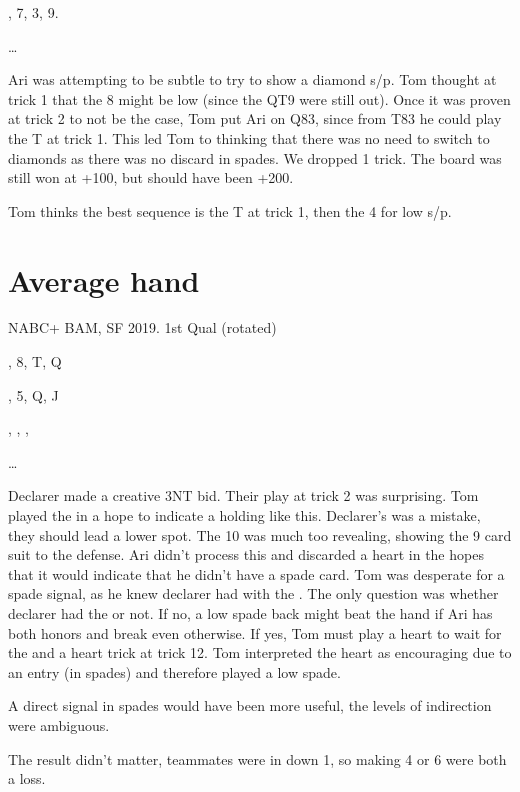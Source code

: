 \documentclass[tom-ari]{subfiles}
\begin{document}
, 7, 3, 9.

 \ldots

Ari was attempting to be subtle to try to show a diamond s/p. Tom thought at trick 1 that the 8 might be low (since the QT9 were still out). Once it was proven at trick 2 to not be the case, Tom put Ari on Q83, since from T83 he could play the T at trick 1. This led Tom to thinking that there was no need to switch to diamonds as there was no discard in spades. We dropped 1 trick. The board was still won at +100, but should have been +200.

Tom thinks the best sequence is the T at trick 1, then the 4 for low s/p. 

\section{Average hand}

NABC+ BAM, SF 2019.  1st Qual (rotated)

\begin{handdiagram}
\end{handdiagram}	


, 8, T, Q

, 5, Q, J

, , , 

 \ldots

Declarer made a creative 3NT bid. Their play at trick 2 was surprising. Tom played the  in a hope to indicate a holding like this. Declarer's  was a mistake, they should lead a lower spot. The 10 was much  too revealing, showing the 9 card suit to the defense. Ari didn't process this and discarded a heart in the hopes that it would indicate that he didn't have a spade card. Tom was desperate for a spade signal, as he knew declarer had  with the . The only question was whether declarer had the  or not. If no, a low spade back might beat the hand if Ari has both honors and break even otherwise. If yes, Tom must play a heart to wait for the  and a heart trick at trick 12. Tom interpreted the heart as encouraging due to an entry (in spades) and therefore played a low spade.

A direct signal in spades would have been more useful, the levels of indirection were ambiguous.

The result didn't matter, teammates were in  down 1, so making 4 or 6 were both a loss.
\end{document}
